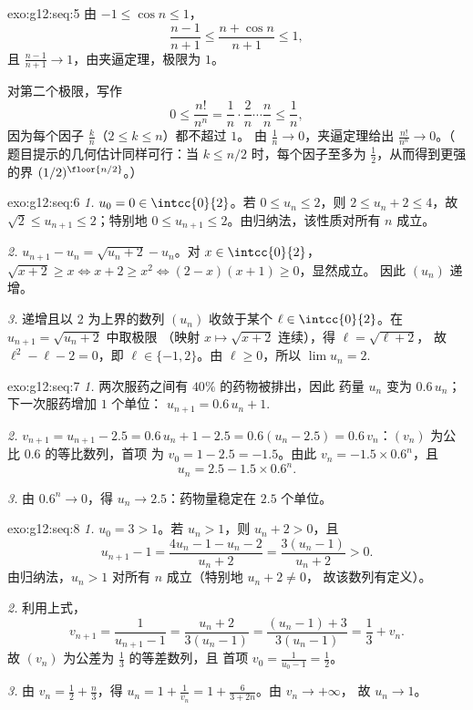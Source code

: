 \begin{solution}{exo:g12:seq:5}
由 $-1 \leq \cos n \leq 1$，
\[
\frac{n-1}{n+1} \leq \frac{n + \cos n}{n+1} \leq 1,
\]
且 $\frac{n-1}{n+1} \to 1$，由夹逼定理，极限为 $1$。

对第二个极限，写作
\[
0 \leq \frac{n!}{n^n}
= \frac{1}{n}\cdot\frac{2}{n}\cdots\frac{n}{n}
\leq \frac{1}{n},
\]
因为每个因子 $\frac{k}{n}$（$2 \leq k \leq n$）都不超过 $1$。
由 $\frac1n \to 0$，夹逼定理给出 $\frac{n!}{n^n} \to 0$。（
题目提示的几何估计同样可行：当 $k \leq n/2$ 时，每个因子至多为
$\frac12$，从而得到更强的界 $(1/2)^{\floor{n/2}}$。）
\end{solution}

\begin{solution}{exo:g12:seq:6}
\emph{1.} $u_0 = 0 \in \intcc{0}{2}$。若 $0 \leq u_n \leq 2$，则
$2 \leq u_n + 2 \leq 4$，故 $\sqrt{2} \leq u_{n+1} \leq 2$；特别地
$0 \leq u_{n+1} \leq 2$。由归纳法，该性质对所有 $n$ 成立。

\emph{2.} $u_{n+1} - u_n = \sqrt{u_n + 2} - u_n$。对 $x \in \intcc{0}{2}$，
$\sqrt{x+2} \geq x \iff x + 2 \geq x^2 \iff (2-x)(x+1) \geq 0$，显然成立。
因此 $(u_n)$ 递增。

\emph{3.} 递增且以 $2$ 为上界的数列 $(u_n)$ 收敛于某个
$\ell \in \intcc{0}{2}$。在 $u_{n+1} = \sqrt{u_n + 2}$ 中取极限
（映射 $x \mapsto \sqrt{x+2}$ 连续），得 $\ell = \sqrt{\ell + 2}$，
故 $\ell^2 - \ell - 2 = 0$，即 $\ell \in \{-1, 2\}$。由 $\ell \geq 0$，所以
$\lim u_n = 2$.
\end{solution}

\begin{solution}{exo:g12:seq:7}
\emph{1.} 两次服药之间有 $40\%$ 的药物被排出，因此
药量 $u_n$ 变为 $0.6\,u_n$；下一次服药增加 $1$ 个单位：
$u_{n+1} = 0.6\,u_n + 1$.

\emph{2.} $v_{n+1} = u_{n+1} - 2.5 = 0.6\,u_n + 1 - 2.5 = 0.6(u_n - 2.5)
= 0.6\,v_n$：$(v_n)$ 为公比 $0.6$ 的等比数列，首项
为 $v_0 = 1 - 2.5 = -1.5$。由此 $v_n = -1.5 \times 0.6^n$，且
\[
u_n = 2.5 - 1.5 \times 0.6^n .
\]

\emph{3.} 由 $0.6^n \to 0$，得 $u_n \to 2.5$：药物量稳定在
$2.5$ 个单位。
\end{solution}

\begin{solution}{exo:g12:seq:8}
\emph{1.} $u_0 = 3 > 1$。若 $u_n > 1$，则 $u_n + 2 > 0$，且
\[
u_{n+1} - 1 = \frac{4u_n - 1 - u_n - 2}{u_n + 2} = \frac{3(u_n - 1)}{u_n + 2} > 0 .
\]
由归纳法，$u_n > 1$ 对所有 $n$ 成立（特别地 $u_n + 2 \neq 0$，
故该数列有定义）。

\emph{2.} 利用上式，
\[
v_{n+1} = \frac{1}{u_{n+1} - 1} = \frac{u_n + 2}{3(u_n - 1)}
= \frac{(u_n - 1) + 3}{3(u_n - 1)} = \frac{1}{3} + v_n .
\]
故 $(v_n)$ 为公差为 $\frac13$ 的等差数列，且
首项 $v_0 = \frac{1}{u_0 - 1} = \frac12$。

\emph{3.} 由 $v_n = \frac12 + \frac{n}{3}$，得
$u_n = 1 + \frac{1}{v_n} = 1 + \frac{6}{3 + 2n}$。由 $v_n \to +\infty$，
故 $u_n \to 1$。
\end{solution}

